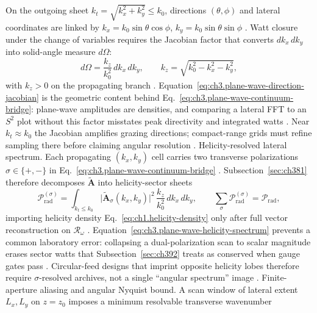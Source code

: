 On the outgoing sheet \(k_{t}=\sqrt{k_{x}^{2}+k_{y}^{2}}\le k_{0}\), directions \((\theta,\phi)\) and lateral coordinates are linked by
\(k_{x}=k_{0}\sin\theta\cos\phi\), \(k_{y}=k_{0}\sin\theta\sin\phi\) \cite{jackson1999}. Watt closure under the change of
variables requires the Jacobian factor that converts \(dk_{x}\,dk_{y}\) into solid-angle measure \(d\Omega\):
\begin{equation}
\label{eq:ch3.plane-wave-direction-jacobian}
d\Omega
=
\frac{k_{z}}{k_{0}^{2}}\,dk_{x}\,dk_{y},
\qquad
k_{z}=\sqrt{k_{0}^{2}-k_{x}^{2}-k_{y}^{2}},
\end{equation}
with \(k_{z}>0\) on the propagating branch \cite{stratton1941}. Equation~\eqref{eq:ch3.plane-wave-direction-jacobian}
is the geometric content behind Eq.~\eqref{eq:ch3.plane-wave-continuum-bridge}: plane-wave amplitudes are densities, and comparing a lateral FFT
to an \(S^{2}\) plot without this factor misstates peak directivity and integrated watts \cite{harrington2001}. Near \(k_{t}\approx k_{0}\)
the Jacobian amplifies grazing directions; compact-range grids must refine sampling there before claiming angular resolution
\cite{hansen1988}.
Helicity-resolved lateral spectrum. Each propagating \((k_{x},k_{y})\) cell carries two transverse polarizations \(\sigma\in\{+,-\}\) in
Eq.~\eqref{eq:ch3.plane-wave-continuum-bridge} \cite{belinfante1940}. Subsection~\ref{sec:ch381} therefore decomposes
\(\widetilde{\mathbf{A}}\) into helicity-sector sheets
\begin{equation}
\label{eq:ch3.plane-wave-helicity-spectrum}
\mathcal{P}_{\mathrm{rad}}^{(\sigma)}
=
\int_{k_{t}\le k_{0}}
\bigl|\widetilde{\mathbf{A}}_{\sigma}(k_{x},k_{y})\bigr|^{2}\,
\frac{k_{z}}{k_{0}^{2}}\,dk_{x}\,dk_{y},
\qquad
\sum_{\sigma}\mathcal{P}_{\mathrm{rad}}^{(\sigma)}=\mathcal{P}_{\mathrm{rad}},
\end{equation}
importing helicity density Eq.~\eqref{eq:ch1.helicity-density} only after full vector reconstruction on \(\mathcal{R}_\omega\)
\cite{belinfante1940}. Equation~\eqref{eq:ch3.plane-wave-helicity-spectrum} prevents a common laboratory error:
collapsing a dual-polarization scan to scalar magnitude erases sector watts that Subsection~\ref{sec:ch392} treats as conserved when gauge gates pass
\cite{belinfante1940}. Circular-feed designs that imprint opposite helicity lobes therefore require \(\sigma\)-resolved archives, not a
single ``angular spectrum'' image \cite{harrington2001}.
Finite-aperture aliasing and angular Nyquist bound. A scan window of lateral extent \(L_{x},L_{y}\) on \(z=z_{0}\) imposes a minimum resolvable transverse wavenumber

